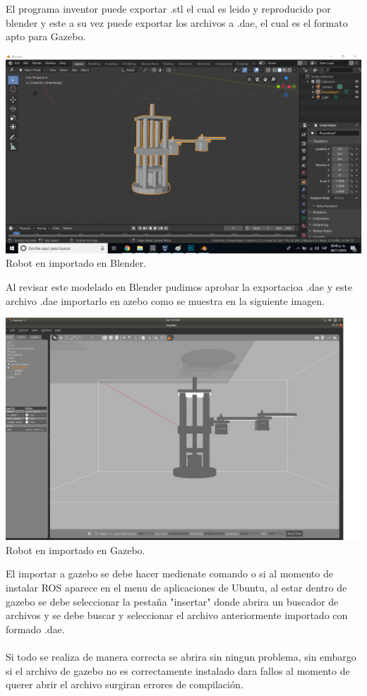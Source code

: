 \documentclass[12pt,a4paper]{article}
\begin{document}
El programa inventor puede exportar .stl el cual es leido y reproducido por blender y este a su vez puede exportar los archivos a .dae, el cual es el formato apto para Gazebo.
\begin{center}
\includegraphics[width=15cm]{Imagenes/RE.png}\\ Robot en importado en Blender.
\end{center}
Al revisar este modelado en Blender pudimos aprobar la exportacioa .dae y este archivo .dae importarlo en azebo como se muestra en la siguiente imagen.\\
\begin{center}
\includegraphics[width=15cm]{Imagenes/RB.jpg}\\ Robot en importado en Gazebo.
\end{center}
El importar a gazebo se debe hacer medienate comando o si al momento de instalar ROS aparece en el menu de aplicaciones de Ubuntu, al estar dentro de gazebo se debe seleccionar la pestaña "insertar" donde abrira un buscador de archivos y se debe buscar y seleccionar el archivo anteriormente importado con formado .dae.\\
\\
Si todo se realiza de manera correcta se abrira sin ningun problema, sin embargo si el archivo de gazebo no es correctamente instalado dara fallos al momento de querer abrir el archivo surgiran errores de compilación.\\
\\
\cite{koenig2004design}
 

\end{document}

